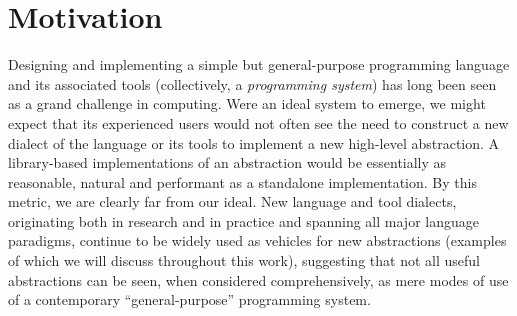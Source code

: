 \vspace{-25pt}
\section{Motivation}\label{motivation}
Designing and implementing a simple but general-purpose programming language and its associated tools (collectively, a \emph{programming system}) has long been seen as a grand challenge in computing. Were an ideal system to emerge, we might expect that its experienced users would not often see the need to construct a new dialect of the language or its tools to implement a new high-level abstraction. A library-based implementations of an abstraction would be essentially as reasonable, natural and performant as a standalone implementation. By this metric, we are clearly far from our ideal. New language and tool dialects, originating both in research and in practice and spanning all major language paradigms, continue to be widely used as vehicles for new abstractions (examples of which we will discuss throughout this work), suggesting that not all useful  abstractions can be seen, when considered comprehensively, as mere modes of use of a contemporary ``general-purpose'' programming system.%

